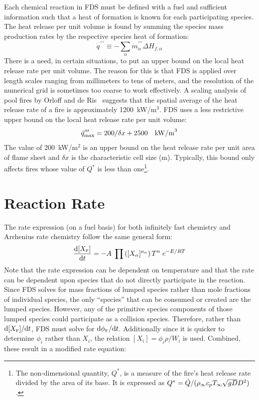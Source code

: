 Each chemical reaction in FDS must be defined with a fuel and sufficient information such that a heat of formation is known for each participating species. The heat release per unit volume is found by summing the species mass production rates by the respective species heat of formation:
\begin{equation}\label{eq:vol_heat_gen}
\dot{q}^{\prime\prime\prime} \equiv -\displaystyle \sum_{\alpha} \dot{m}^{\prime\prime\prime}_{\alpha} \Delta H_{f,\alpha}
\end{equation}
There is a need, in certain situations, to put an upper bound on the local heat release rate per unit volume. The reason for
this is that FDS is applied over length scales ranging from millimeters to tens of meters, and the resolution of the numerical grid
is sometimes too coarse to work effectively.
A scaling analysis of pool fires by Orloff and de Ris~\cite{Orloff:19th_Symposium} suggests that the spatial average of the
heat release rate of a fire is approximately 1200~kW/m$^3$. FDS uses a less restrictive upper bound on the local heat release rate per unit volume:
\begin{equation}\label{eq:q_bound} 
\dot{q}_{\max}''' = 200/\delta x + 2500 \quad \hbox{kW/m}^3 
\end{equation}
The value of 200~kW/m$^2$ is an upper bound on the heat release rate per unit area of flame sheet and $\delta x$ is the characteristic cell size (m). Typically, this bound only affects fires whose value of $Q^*$ is less than one\footnote{The non-dimensional quantity, $Q^*$, is a measure of the fire's heat release rate divided by the
area of its base. It is expressed as $Q^*=\dot{Q}/(\rho_\infty c_p T_\infty \sqrt{g D} D^2)$.}.

\section{Reaction Rate} 

\label{Reaction_Rate_Model}

The rate expression (on a fuel basis) for both infinitely fast chemistry and Arrhenius rate chemistry follow the same general form:
\begin{equation}\label{eq:Arrheniusrateeqn}
\frac{\mbox{d}[X_{\tiny \hbox{F}}]}{\mbox{d}t} = -A \; \prod \left([X_{\alpha}]^{a_{\alpha}} \right) T^n \; e^{-E/RT} 
\end{equation}
Note that the rate expression can be dependent on temperature and that the rate can be dependent upon species that do not directly participate in the reaction. Since FDS solves for mass fractions of lumped species rather than mole fractions of individual species, the only ``species'' that can be consumed or created are the lumped species.  However, any of the primitive species components of those lumped species could participate as a collision species.  Therefore, rather than $\mbox{d}[X_{\tiny \hbox{F}}]/\mbox{d}t$,  FDS must solve for $\mbox{d}\phi_{\tiny \hbox{F}}/\mbox{d}t$.  Additionally since it is quicker to determine $\phi_i$ rather than $X_i$, the relation $[X_i]=\phi_i \rho/W_i$ is used.  Combined, these result in a modified rate equation:

